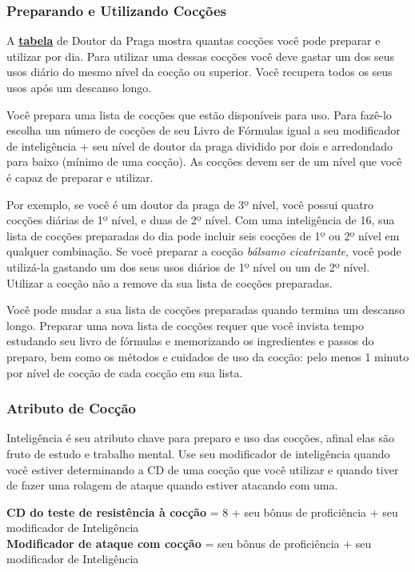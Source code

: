 \documentclass[letterpaper,twocolumn,openany]{dndbook}
\begin{document}
	\subsubsection{Preparando e Utilizando Cocções}
	A \hyperref[tab:doutor_da_praga]{\textbf{tabela}} de Doutor da Praga mostra quantas cocções você pode preparar e utilizar por dia. Para utilizar uma dessas cocções você deve gastar um dos seus usos diário do mesmo nível da cocção ou superior. Você recupera todos os seus usos após um descanso longo.
	\par Você prepara uma lista de cocções que estão disponíveis para uso. Para fazê-lo escolha um número de cocções de seu Livro de Fórmulas igual a seu modificador de inteligência + seu nível de doutor da praga dividido por dois e arredondado para baixo (mínimo de uma cocção). As cocções devem ser de um nível que você é capaz de preparar e utilizar.
	\par Por exemplo, se você é um doutor da praga de 3º nível, você possui quatro cocções diárias de 1º nível, e duas de 2º nível. Com uma inteligência de 16, sua lista de cocções preparadas do dia pode incluir seis cocções de 1º ou 2º nível em qualquer combinação. Se você preparar a cocção \textit{bálsamo cicatrizante}, você pode utilizá-la gastando um dos seus usos diários de 1º nível ou um de 2º nível. Utilizar a cocção não a remove da sua lista de cocções preparadas.
	\par Você pode mudar a sua lista de cocções preparadas quando termina um descanso longo. Preparar uma nova lista de cocções requer que você invista tempo estudando seu livro de fórmulas e memorizando os ingredientes e passos do preparo, bem como os métodos e cuidados de uso da cocção: pelo menos 1 minuto por nível de cocção de cada cocção em sua lista.
	
	\subsubsection{Atributo de Cocção}
	Inteligência é seu atributo chave para preparo e uso das cocções, afinal elas são fruto de estudo e trabalho mental. Use seu modificador de inteligência quando você estiver determinando a CD de uma cocção que você utilizar e quando tiver de fazer uma rolagem de ataque quando estiver atacando com uma.
	
	{\footnotesize
	\textbf{CD do teste de resistência à cocção} = 8 + seu bônus de proficiência + seu modificador de Inteligência\\
	\textbf{Modificador de ataque com cocção} = seu bônus de proficiência + seu modificador de Inteligência
	}
\end{document}
